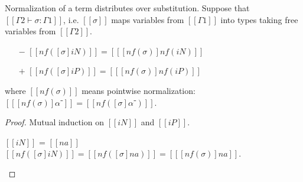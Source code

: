 \begin{lemma}
  \label{lemma:norm-subst-distr} Normalization of a term distributes over substitution.
  Suppose that $[[Γ2 ⊢ σ : Γ1]]$, i.e. $[[σ]]$ maps variables from $[[Γ1]]$ into types
  taking free variables from $[[Γ2]]$.
  \begin{itemize}
  \item[$-$] $[[nf([σ]iN)]] = [[ [nf(σ)] nf(iN) ]]$
  \item[$+$] $[[nf([σ]iP)]] = [[ [nf(σ)] nf(iP) ]]$
  \end{itemize}
  where $[[nf(σ)]]$ means pointwise normalization: $[[ [nf(σ)] α⁻]] = [[nf([σ]
  α⁻)]]$. %
\end{lemma}
\begin{proof}
  Mutual induction on $[[iN]]$ and $[[iP]]$.
  \begin{caseof}
    \item $[[iN]]$ = $[[na]]$ \\
      \label{case:norm-subst-distr-var}
      $[[nf([σ]iN)]] = [[ nf([σ]na) ]] = [[ [nf(σ)]na ]] $.


\end{caseof}
\end{proof}
